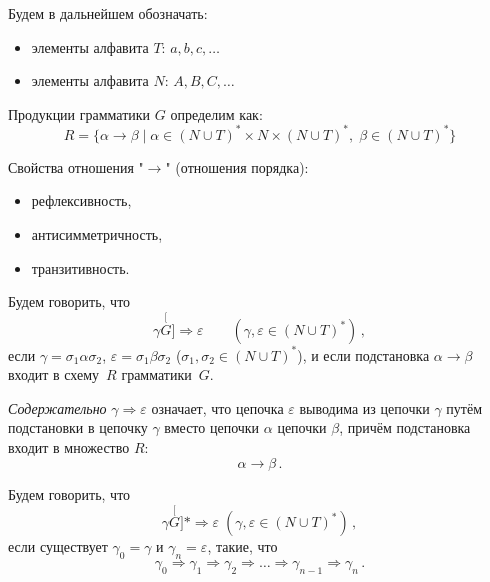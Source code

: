 \begin{rem}
  Будем в дальнейшем обозначать:
  \begin{itemize}
  \item элементы алфавита $T$: $a, b, c, \ldots$
  \item элементы алфавита $N$: $A, B, C, \ldots$
  \end{itemize}
\end{rem}

\begin{defin}
  Продукции грамматики $G$ определим как:
  \begin{equation}
    \label{eq:rule}
    R = \{\alpha\to\beta \mid \alpha \in (N \cup T)^{*} \times N \times (N
    \cup T)^{*},\; \beta \in (N \cup T)^{*}\}
  \end{equation}
\end{defin}

\begin{rem}
  Свойства отношения "$\to$" (отношения порядка):
      \begin{itemize}
      \item рефлексивность,
      \item антисимметричность,
      \item транзитивность.
      \end{itemize}
\end{rem}

\begin{defin}
  Будем говорить, что
  \begin{equation}
    \label{eq:deduction}
    \gamma \stackrel[G]{}{\Rightarrow} \varepsilon\qquad (\gamma,
    \varepsilon \in (N \cup T)^*)\,,
  \end{equation}
  если $\gamma = \sigma_1 \alpha \sigma_2$, $\varepsilon = \sigma_1
  \beta \sigma_2$ ($\sigma_1, \sigma_2 \in (N \cup T)^*$),
  и если подстановка $\alpha \to \beta$ входит в схему~$R$ грамматики~$G$.
\end{defin}

\emph{Содержательно} $\gamma \Rightarrow \varepsilon$ означает, что
цепочка $\varepsilon$ выводима из цепочки $\gamma$ путём подстановки в
цепочку $\gamma$ вместо цепочки $\alpha$ цепочки $\beta$, причём
подстановка входит в множество $R$: $$\alpha \to \beta\,.$$

\begin{defin}
  Будем говорить, что $$\gamma \stackrel[G]{*}{\Rightarrow}
  \varepsilon \; (\gamma,\varepsilon \in (N \cup T)^{*})\,,$$
  если существует $\gamma_0 = \gamma$ и $\gamma_n = \varepsilon$,
  такие, что $$\gamma_0 \Rightarrow \gamma_1 \Rightarrow \gamma_2
  \Rightarrow \ldots \Rightarrow \gamma_{n-1} \Rightarrow \gamma_n\,.$$
\end{defin}

